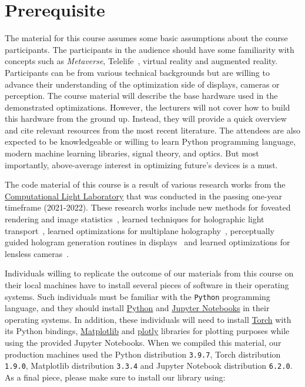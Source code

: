 \chapter*{Prerequisite}

The material for this course assumes some basic assumptions about the course participants.
The participants in the audience should have some familiarity with concepts such as \textit{Metaverse},  Telelife~\citep{10.3389/frvir.2021.763340}, virtual reality and augmented reality.
Participants can be from various technical backgrounds but are willing to advance their understanding of the optimization side of displays, cameras or perception.
The course material will describe the base hardware used in the demonstrated optimizations.
However, the lecturers will not cover how to build this hardware from the ground up. 
Instead, they will provide a quick overview and cite relevant resources from the most recent literature.
The attendees are also expected to be knowledgeable or willing to learn Python programming language, modern machine learning libraries, signal theory, and optics.
But most importantly, above-average interest in optimizing future's devices is a must.

The code material of this course is a result of various research works from the \href{https://complightlab.com}{Computational Light Laboratory} that was conducted in the passing one-year timeframe (2021-2022). 
These research works include new methods for foveated rendering and image statistics~\citep{walton2021beyond}, learned techniques for holographic light transport~\citep{kavakli2022learned}, learned optimizations for multiplane holography~\citep{kavakli2022realisticdefocus}, perceptually guided hologram generation routines in displays~\citep{walton2021metameric} and learned optimizations for lensless cameras~\citep{kingshott2022unrolled}.

Individuals willing to replicate the outcome of our materials from this course on their local machines have to install several pieces of software in their operating systems.
Such individuals must be familiar with the \texttt{Python} programming language, and they should install \href{https://www.python.org/}{Python} and \href{https://jupyter.org/}{Jupyter Notebooks} in their operating systems.
In addition, these individuals will need to install \href{https://pytorch.org/}{Torch} with its Python bindings, \href{https://matplotlib.org/}{Matplotlib} and \href{https://plotly.com/}{plotly} libraries for plotting purposes while using the provided Jupyter Notebooks. 
When we compiled this material, our production machines used the Python distribution \texttt{3.9.7}, Torch distribution \texttt{1.9.0}, Matplotlib distribution \texttt{3.3.4} and Jupyter Notebook distribution \texttt{6.2.0}. As a final piece, please make sure to install our
library using:

